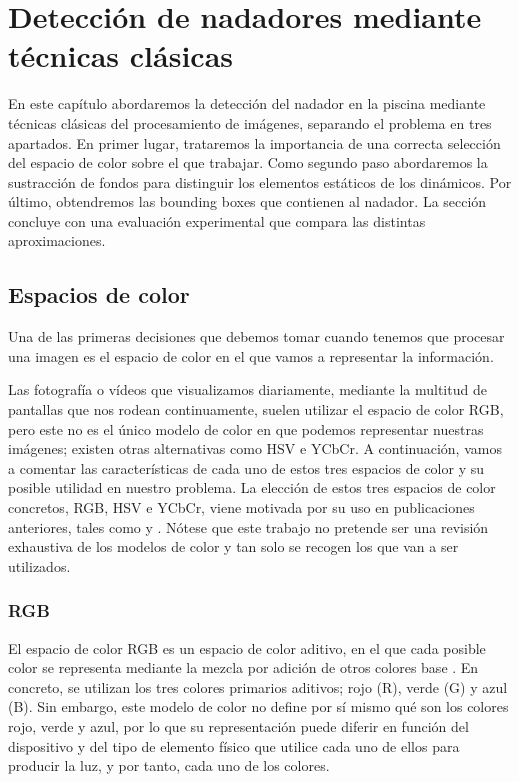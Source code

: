 \chapter{Detección de nadadores mediante técnicas clásicas } \label{cap:capitulo3}

En este capítulo abordaremos la detección del nadador en la piscina mediante técnicas clásicas del procesamiento de imágenes, separando el problema en tres apartados. En primer lugar, trataremos la importancia de una correcta selección del espacio de color sobre el que trabajar. Como segundo paso abordaremos la sustracción de fondos para distinguir los elementos estáticos de los dinámicos. Por último, obtendremos las bounding boxes que contienen al nadador. La sección concluye con una evaluación experimental que compara las distintas aproximaciones.

\section{Espacios de color}

Una de las primeras decisiones que debemos tomar cuando tenemos que procesar una imagen es el espacio de color en el que vamos a representar la información.

Las fotografía o vídeos que visualizamos diariamente, mediante la multitud de pantallas que nos rodean continuamente, suelen utilizar el espacio de color RGB, pero este no es el único modelo de color en que podemos representar nuestras imágenes; existen otras alternativas como HSV e YCbCr. A continuación, vamos a comentar las características de cada uno de estos tres espacios de color y su posible utilidad en nuestro problema. La elección de estos tres espacios de color concretos, RGB, HSV e YCbCr, viene motivada por su uso en publicaciones anteriores, tales como \cite{swimmerarti} y \cite{swimmerartii}. Nótese que este trabajo no pretende ser una revisión exhaustiva de los modelos de color y tan solo se recogen los que van a ser utilizados.

\subsection{RGB}

El espacio de color RGB es un espacio de color aditivo, en el que cada posible color se representa mediante la mezcla por adición de otros colores base \cite{abitofallcolorspaces}. En concreto, se utilizan los tres colores primarios aditivos; rojo (R), verde (G) y azul (B). Sin embargo, este modelo de color no define por sí mismo qué son los colores rojo, verde y azul, por lo que su representación puede diferir en función del dispositivo y del tipo de elemento físico que utilice cada uno de ellos para producir la luz, y por tanto, cada uno de los colores.


